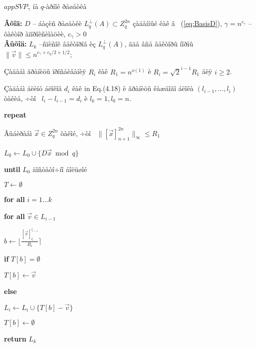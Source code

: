 \documentclass[a4paper,12pt]{article}
\begin{document}
\begin{algorithm}[t]
	\caption{$appSVP_{\gamma}$ íà $q$-àðíîé ðåøåòêå}
	\textbf{Âõîä:} $D$ -- áàçèñ ðåøåòêè $L^{\perp}_q (A) \subset Z_q^{2n}$ çàäàííûé êàê â ~(\ref{eq:BasisD}), $\gamma = n^{c_{\gamma}}$ -- ôàêòîð àïïðîêñèìàöèè, $c_{\gamma}>0$ \\
	\textbf{Âûõîä:} $L_k$ --ñïèñîê âåêòîðîâ èç $L^{\perp}_q (A)$, ãäå âñå âåêòîðû íîðìû $\| \vec{v} \| \leq n^{c_{\gamma}+c_q/2+1/2}$;
	
	\begin{algorithmic}[1]
		
		\item Çàäàåì ãðàíèöû ïðîñåèâàíèÿ $R_i$ êàê $R_1 = n^{o(1)}$ è $R_i = \sqrt{2}^{i-1} R_1$ äëÿ $i \geq 2$.
		\item Çàäàåì äëèíó áëîêîâ $d_i$ êàê in Eq.(4.18) è ãðàíèöû êàæäîãî áëîêà $(l_{i-1}, \ldots, l_i)$ òàêèå, ÷òî \ $l_{i}-{l_{i-1}} = d_i$ è $l_k = 1, l_0 = n$.
		
		\item \textbf{repeat}
		\item Âûáèðàåì $\vec{x} \in Z_q^{2n}$ òàêîé, ÷òî \ $\| [\vec{x}]_{n+1}^{2n} \|_{\infty} \leq R_1$
		\item $L_0 \gets L_0  \cup \{D\vec{x} \bmod q\}$
		\item \textbf{until} {$L_0$ äîñòàòî÷íî áîëüøîé}
		
		\item $T \gets \emptyset$
		\item \textbf{for all} {$i=1 \ldots k$}
		\item	\textbf{for all} { $\vec{v} \in L_{i-1}$}
		\item		$b \gets \Big\lfloor \frac{[\vec{v}]_{l_i}^{l_{i-1}}}{R_i} \Big\rceil$
		\item		\textbf{if} {$T[b] = \emptyset$}
		\item			$T[b] \gets \vec{v}$
		\item		\textbf{else}
		\item			$L_{i} \gets L_{i} \cup \{T[b] - \vec{v} \}$
		\item			$T[b] \gets \emptyset$
		\item \textbf{return} $L_k$
	\end{algorithmic}
	
	\vspace{10pt}
	
\end{algorithm}
\end{document}
